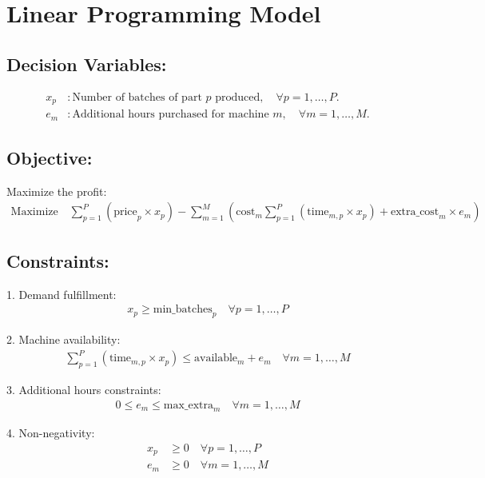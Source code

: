 \documentclass{article}
\begin{document}
\section*{Linear Programming Model}

\subsection*{Decision Variables:}
\begin{align*}
x_p & : \text{Number of batches of part } p \text{ produced}, \quad \forall p = 1, \ldots, P. \\
e_m & : \text{Additional hours purchased for machine } m, \quad \forall m = 1, \ldots, M.
\end{align*}

\subsection*{Objective:}
Maximize the profit:
\begin{align*}
\text{Maximize} \quad \sum_{p=1}^{P} (\text{price}_p \times x_p) - \sum_{m=1}^{M} \left(\text{cost}_m \sum_{p=1}^{P} (\text{time}_{m,p} \times x_p) + \text{extra\_cost}_m \times e_m \right)
\end{align*}

\subsection*{Constraints:}
1. Demand fulfillment:
\begin{align*}
x_p \geq \text{min\_batches}_p \quad \forall p = 1, \ldots, P
\end{align*}

2. Machine availability:
\begin{align*}
\sum_{p=1}^{P} (\text{time}_{m,p} \times x_p) \leq \text{available}_m + e_m \quad \forall m = 1, \ldots, M
\end{align*}

3. Additional hours constraints:
\begin{align*}
0 \leq e_m \leq \text{max\_extra}_m \quad \forall m = 1, \ldots, M
\end{align*}

4. Non-negativity:
\begin{align*}
x_p & \geq 0 \quad \forall p = 1, \ldots, P \\
e_m & \geq 0 \quad \forall m = 1, \ldots, M
\end{align*}
\end{document}
